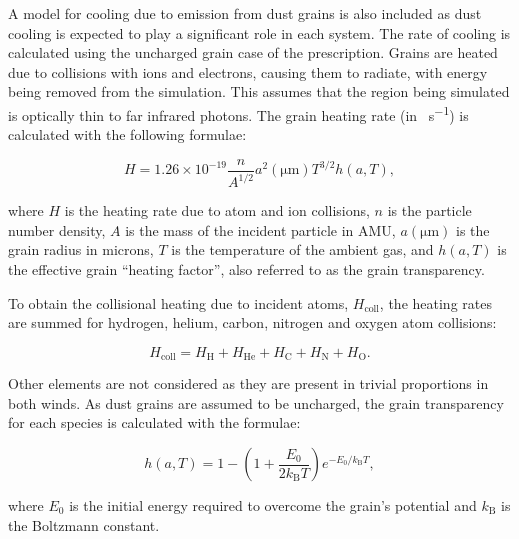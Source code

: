 \documentclass[fleqn,usenatbib]{mnras}
\begin{document}
A model for cooling due to emission from dust grains is also included as dust cooling is expected to play a significant role in each system.
The rate of cooling is calculated using the uncharged grain case of the \cite{dwek_infrared_1981} prescription.
Grains are heated due to collisions with ions and electrons, causing them to radiate, with energy being removed from the simulation.
This assumes that the region being simulated is optically thin to far infrared photons.
The grain heating rate (in \si{\erg\per\second}) is calculated with the following formulae:

\begin{equation}
    H = 1.26 \times 10^{-19} \frac{n}{A^{1/2}} a^2(\si{\micro\metre}) T^{3/2} h(a,T) , 
\end{equation}

\noindent
where $H$ is the heating rate due to atom and ion collisions, 
$n$ is the particle number density,
$A$ is the mass of the incident particle in AMU,
$a(\si{\micro\metre})$ is the grain radius in microns,
$T$ is the temperature of the ambient gas,
and $h(a,T)$ is the effective grain ``heating factor'', also referred to as the grain transparency. 

To obtain the collisional heating due to incident atoms, $H_\text{coll}$, the heating rates are summed for hydrogen, helium, carbon, nitrogen and oxygen atom collisions:

\begin{equation}
  H_\text{coll} = H_\text{H} + H_\text{He} + H_\text{C} + H_\text{N} + H_\text{O} .
\end{equation}

\noindent
Other elements are not considered as they are present in trivial proportions in both winds.
As dust grains are assumed to be uncharged, the grain transparency for each species is calculated with the formulae:

\begin{equation}
  h(a,T) = 1 - \left( 1 + \frac{E_0}{2 k_\text{B} T} \right) e^{- E_0 / k_\text{B} T} ,
\end{equation}

\noindent
where $E_0$ is the initial energy required to overcome the grain's potential and $k_\text{B}$ is the Boltzmann constant.
\end{document}
